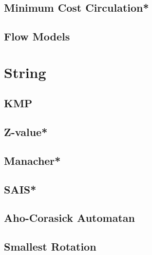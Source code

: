 \subsection{Minimum Cost Circulation*} %

\subsection{Flow Models}

% 


\section{String}
\subsection{KMP}

\subsection{Z-value*} %

\subsection{Manacher*} %

%
\subsection{SAIS*} %

\subsection{Aho-Corasick Automatan}

\subsection{Smallest Rotation}

